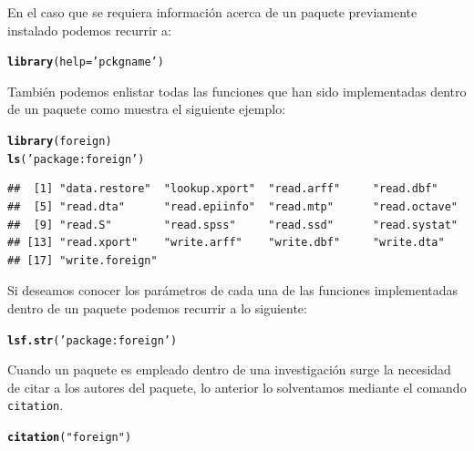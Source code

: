 \documentclass[11pt,a4paper,oneside]{book}\usepackage[]{graphicx}\usepackage[]{color}
\makeatletter
\newcommand{\hlstr}[1]{\textcolor[rgb]{0.192,0.494,0.8}{#1}}%
\newcommand{\hlstd}[1]{\textcolor[rgb]{0.345,0.345,0.345}{#1}}%
\newcommand{\hlkwc}[1]{\textcolor[rgb]{0.333,0.667,0.333}{#1}}%
\newcommand{\hlkwd}[1]{\textcolor[rgb]{0.737,0.353,0.396}{\textbf{#1}}}%
\newenvironment{kframe}{%
 \def\at@end@of@kframe{}%
 \ifinner\ifhmode%
  \def\at@end@of@kframe{\end{minipage}}%
  \begin{minipage}{\columnwidth}%
 \fi\fi%
 \def\FrameCommand##1{\hskip\@totalleftmargin \hskip-\fboxsep
 \colorbox{shadecolor}{##1}\hskip-\fboxsep
     \hskip-\linewidth \hskip-\@totalleftmargin \hskip\columnwidth}%
 \MakeFramed {\advance\hsize-\width
   \@totalleftmargin\z@ \linewidth\hsize
   \@setminipage}}%
 {\par\unskip\endMakeFramed%
 \at@end@of@kframe}
\newenvironment{knitrout}{}{} %
\makeatother
\begin{document}
\begin{itemize}
En el caso que se requiera información acerca de un paquete previamente instalado podemos recurrir a:
\begin{knitrout}
\color{fgcolor}\begin{kframe}
\begin{alltt}
\hlkwd{library}\hlstd{(}\hlkwc{help}\hlstd{=}\hlstr{'pckgname'}\hlstd{)}
\end{alltt}
\end{kframe}
\end{knitrout}
También podemos enlistar todas las funciones que han sido implementadas dentro de un paquete como muestra el siguiente ejemplo:
\begin{knitrout}
\color{fgcolor}\begin{kframe}
\begin{alltt}
\hlkwd{library}\hlstd{(foreign)}
\hlkwd{ls}\hlstd{(}\hlstr{'package:foreign'}\hlstd{)}
\end{alltt}
\begin{verbatim}
##  [1] "data.restore"  "lookup.xport"  "read.arff"     "read.dbf"     
##  [5] "read.dta"      "read.epiinfo"  "read.mtp"      "read.octave"  
##  [9] "read.S"        "read.spss"     "read.ssd"      "read.systat"  
## [13] "read.xport"    "write.arff"    "write.dbf"     "write.dta"    
## [17] "write.foreign"
\end{verbatim}
\end{kframe}
\end{knitrout}
Si deseamos conocer los parámetros de cada una de las funciones implementadas dentro de un paquete podemos recurrir a lo siguiente:
\begin{knitrout}
\color{fgcolor}\begin{kframe}
\begin{alltt}
\hlkwd{lsf.str}\hlstd{(}\hlstr{'package:foreign'}\hlstd{)}
\end{alltt}
\end{kframe}
\end{knitrout}

Cuando un paquete es empleado dentro de una investigación surge la necesidad de citar a los autores del paquete, lo anterior lo solventamos mediante el comando \texttt{citation}.
\begin{knitrout}
\color{fgcolor}\begin{kframe}
\begin{alltt}
\hlkwd{citation}\hlstd{(}\hlstr{"foreign"}\hlstd{)}


\end{alltt}
\end{kframe}
\end{knitrout}
\end{itemize}
\end{document}
